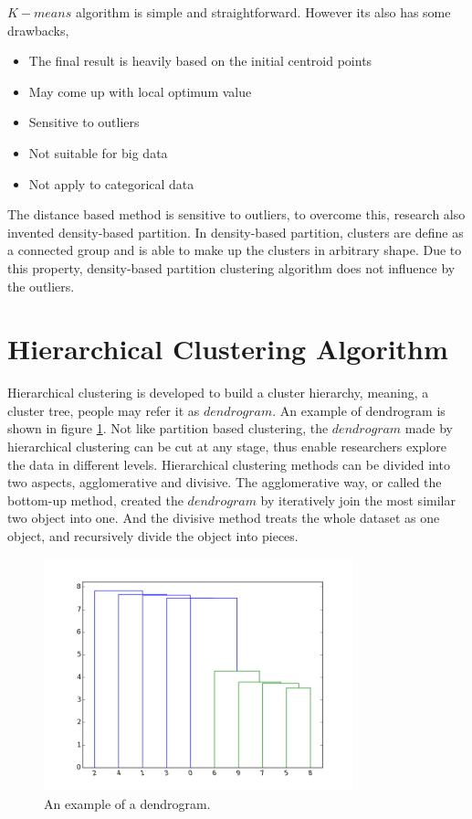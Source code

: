 \documentclass[utf8,english]{gradu3}
\begin{document}
$K-means$ algorithm is simple and straightforward. However its also has some drawbacks,

\begin{itemize}
	\item The final result is heavily based on the initial centroid points
	\item May come up with local optimum value
	\item Sensitive to outliers
	\item Not suitable for big data
	\item Not apply to categorical data
\end{itemize}

The distance based method is sensitive to outliers, to overcome this, research also invented density-based partition. In density-based partition, clusters are define as a connected group and is able to make up the clusters in arbitrary shape. Due to this property, density-based partition clustering algorithm does not influence by the outliers.


\section{Hierarchical Clustering Algorithm}

Hierarchical clustering is developed to build a cluster hierarchy, meaning, a cluster tree, people may refer it as $dendrogram$. An example of dendrogram is shown in figure \ref{fig:a_dendrogram}. Not like partition based clustering, the $dendrogram$ made by hierarchical clustering can be cut at any stage, thus enable researchers explore the data in different levels. Hierarchical clustering methods can be divided into two aspects, agglomerative and divisive. The agglomerative way, or called the bottom-up method, created the $dendrogram$ by iteratively join the most similar two object into one. And the divisive method treats the whole dataset as one object, and recursively divide the object into pieces.

\begin{figure}
	\centering
	\includegraphics[width=0.80\textwidth]{pic/dendrogram.png}
	\caption{An example of a dendrogram.}
	\label{fig:a_dendrogram}
\end{figure}
\end{document}
